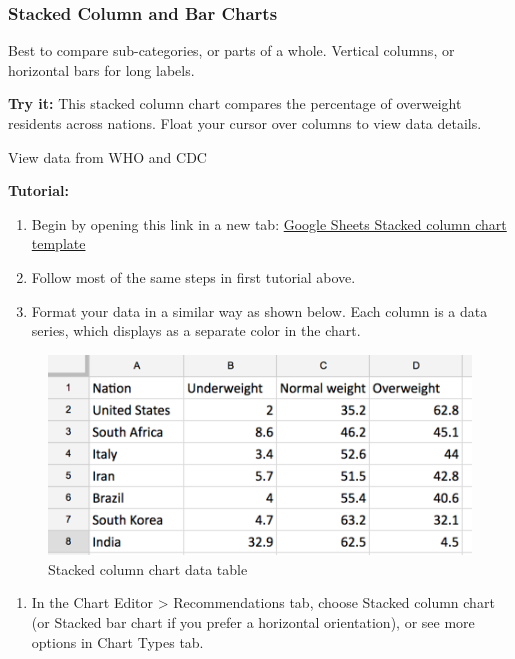 \documentclass[
  english,
]{book}
\providecommand{\tightlist}{%
  \setlength{\itemsep}{0pt}\setlength{\parskip}{0pt}}
\begin{document}
\hypertarget{stacked-column-and-bar-charts}{%
\subsubsection*{Stacked Column and Bar Charts}\label{stacked-column-and-bar-charts}}

Best to compare sub-categories, or parts of a whole. Vertical columns, or horizontal bars for long labels.

\textbf{Try it:} This stacked column chart compares the percentage of overweight residents across nations. Float your cursor over columns to view data details.

View data from WHO and CDC

\textbf{Tutorial:}

\begin{enumerate}
\def\labelenumi{\arabic{enumi})}
\item
  Begin by opening this link in a new tab: \href{https://docs.google.com/spreadsheets/d/1WS11EK33JCmvCRzSDh9UpP6R7Z2sHglF7ve5iJL6eZk/}{Google Sheets Stacked column chart template}
\item
  Follow most of the same steps in first tutorial above.
\item
  Format your data in a similar way as shown below. Each column is a data series, which displays as a separate color in the chart.
\end{enumerate}

\begin{figure}
\centering
\includegraphics{images/05-chart/stacked-column-data.png}
\caption{Stacked column chart data table}
\end{figure}

\begin{enumerate}
\def\labelenumi{\arabic{enumi})}
\setcounter{enumi}{3}
\tightlist
\item
  In the Chart Editor \textgreater{} Recommendations tab, choose Stacked column chart (or Stacked bar chart if you prefer a horizontal orientation), or see more options in Chart Types tab.
\end{enumerate}
\end{document}
